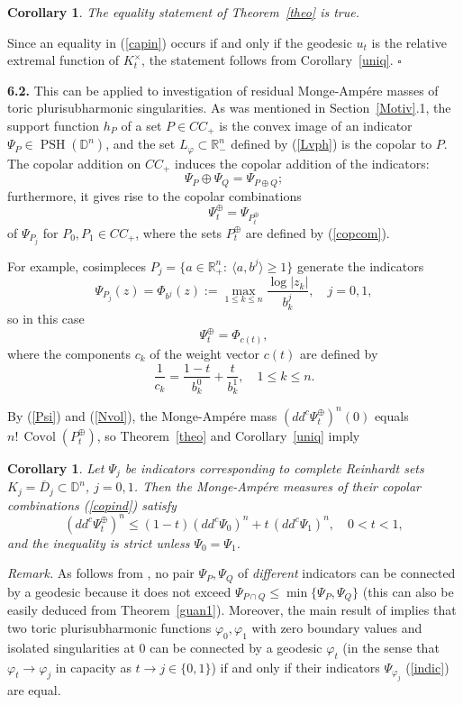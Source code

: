 \documentclass[12pt]{article}
\newcommand{\beq}{\begin{equation}}
\newcommand{\eeq}{\end{equation}}
\numberwithin{equation}{section}
\newtheorem{corollary}[theorem]{Corollary}
\newenvironment{proof}{\medbreak\noindent{\it Proof.}\rm}{\hfill$\square$\rm}
\newcommand{\PSH}{{\operatorname{PSH}}}
\newcommand{\Covol}{{\operatorname{Covol}}}
\newcommand{\D}{{\mathbb D}}
\newcommand{\Rnm}{{\mathbb R}_-^n}
\newcommand{\Rnp}{{\mathbb R}_+^n}
\newcommand{\vph}{\varphi}
\begin{document}
\begin{corollary}\label{uniq1} The equality statement of Theorem~\ref{theo} is true.
\end{corollary}

\begin{proof} Since an equality in (\ref{capin}) occurs if and only if the geodesic $u_t$ is the relative extremal function of $K_t^\times$, the statement follows from Corollary~\ref{uniq}.
\end{proof}

\bigskip
\noindent
{\bf 6.2.} This can be applied to investigation of residual Monge-Amp\'ere masses of toric plurisubharmonic singularities.
As was mentioned in Section~\ref{Motiv}.1, the support function $h_P$ of a set $P\in CC_+$ is the convex image of an indicator $\Psi_P\in\PSH(\D^n)$, and the set $L_\vph\subset\Rnm$ defined by (\ref{Lvph}) is the copolar to $P$. The copolar addition on $CC_+$ induces the copolar addition of the indicators:
$$ \Psi_P\oplus\Psi_Q= \Psi_{P\oplus Q};$$
furthermore, it gives rise to the copolar combinations
\beq\label{copind}\Psi_t^\oplus= \Psi_{P_t^\oplus}\eeq
of $\Psi_{P_j}$ for $P_0,P_1\in CC_+$, where the sets
$ P_t^\oplus$ are defined by (\ref{copcom}).

For example, cosimpleces $P_j=\{a\in\Rnp:\: \langle a,b^j\rangle\ge 1\}$ generate the indicators
$$\Psi_{P_j}(z)=\Phi_{b^j}(z):=\max_{1\le k\le n}\frac{\log|z_k|}{b_k^j},\quad j=0,1,$$
so in this case
$$\Psi_t^\oplus=\Phi_{c(t)} ,$$
where the components $c_k$ of the weight vector $c(t)$ are defined by
$$\frac1{c_k}=\frac{1-t}{b_k^0}+\frac{t}{b_k^1},\quad 1\le k\le n.$$

By (\ref{Psi}) and (\ref{Nvol}),
the Monge-Amp\'ere mass $(dd^c\Psi_t^\oplus)^n(0)$ equals $n!\,\Covol(P_t^\oplus)$, so Theorem~\ref{theo} and Corollary~\ref{uniq} imply

\begin{corollary} Let $\Psi_j$ be indicators corresponding to complete Reinhardt sets $K_j={\overline D_j}\subset\D^n$, $j=0,1$. Then the Monge-Amp\'ere measures of their copolar combinations (\ref{copind}) satisfy
$$ (dd^c\Psi_t^\oplus)^n\le (1-t)(dd^c\Psi_0)^n + t\,(dd^c\Psi_1)^n,\quad 0<t<1,$$
and the inequality is strict unless $\Psi_0=\Psi_1$.
\end{corollary}

{\it Remark.} As follows from \cite[Thm. 6.2]{R16}, no pair $\Psi_P,\Psi_Q$ of {\sl different} indicators can be connected by a geodesic because it does not exceed $\Psi_{P\cap Q}\le \min\{\Psi_P,\Psi_Q\}$ (this can also be easily deduced from Theorem~\ref{guan1}). Moreover, the main result of \cite{Ho} implies that two toric plurisubharmonic functions $\vph_0,\vph_1$ with zero boundary values and isolated singularities at $0$ can be connected by a geodesic $\vph_t$ (in the sense that $\vph_t\to \vph_j$ in capacity as $t\to j\in\{0,1\}$) if and only if their indicators $\Psi_{\vph_j}$ (\ref{indic}) are equal.
\end{document}
